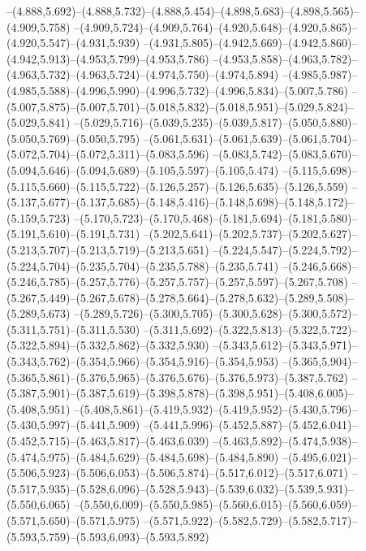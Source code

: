   --(4.888,5.692)--(4.888,5.732)--(4.888,5.454)--(4.898,5.683)--(4.898,5.565)--(4.909,5.758)%
  --(4.909,5.724)--(4.909,5.764)--(4.920,5.648)--(4.920,5.865)--(4.920,5.547)--(4.931,5.939)%
  --(4.931,5.805)--(4.942,5.669)--(4.942,5.860)--(4.942,5.913)--(4.953,5.799)--(4.953,5.786)%
  --(4.953,5.858)--(4.963,5.782)--(4.963,5.732)--(4.963,5.724)--(4.974,5.750)--(4.974,5.894)%
  --(4.985,5.987)--(4.985,5.588)--(4.996,5.990)--(4.996,5.732)--(4.996,5.834)--(5.007,5.786)%
  --(5.007,5.875)--(5.007,5.701)--(5.018,5.832)--(5.018,5.951)--(5.029,5.824)--(5.029,5.841)%
  --(5.029,5.716)--(5.039,5.235)--(5.039,5.817)--(5.050,5.880)--(5.050,5.769)--(5.050,5.795)%
  --(5.061,5.631)--(5.061,5.639)--(5.061,5.704)--(5.072,5.704)--(5.072,5.311)--(5.083,5.596)%
  --(5.083,5.742)--(5.083,5.670)--(5.094,5.646)--(5.094,5.689)--(5.105,5.597)--(5.105,5.474)%
  --(5.115,5.698)--(5.115,5.660)--(5.115,5.722)--(5.126,5.257)--(5.126,5.635)--(5.126,5.559)%
  --(5.137,5.677)--(5.137,5.685)--(5.148,5.416)--(5.148,5.698)--(5.148,5.172)--(5.159,5.723)%
  --(5.170,5.723)--(5.170,5.468)--(5.181,5.694)--(5.181,5.580)--(5.191,5.610)--(5.191,5.731)%
  --(5.202,5.641)--(5.202,5.737)--(5.202,5.627)--(5.213,5.707)--(5.213,5.719)--(5.213,5.651)%
  --(5.224,5.547)--(5.224,5.792)--(5.224,5.704)--(5.235,5.704)--(5.235,5.788)--(5.235,5.741)%
  --(5.246,5.668)--(5.246,5.785)--(5.257,5.776)--(5.257,5.757)--(5.257,5.597)--(5.267,5.708)%
  --(5.267,5.449)--(5.267,5.678)--(5.278,5.664)--(5.278,5.632)--(5.289,5.508)--(5.289,5.673)%
  --(5.289,5.726)--(5.300,5.705)--(5.300,5.628)--(5.300,5.572)--(5.311,5.751)--(5.311,5.530)%
  --(5.311,5.692)--(5.322,5.813)--(5.322,5.722)--(5.322,5.894)--(5.332,5.862)--(5.332,5.930)%
  --(5.343,5.612)--(5.343,5.971)--(5.343,5.762)--(5.354,5.966)--(5.354,5.916)--(5.354,5.953)%
  --(5.365,5.904)--(5.365,5.861)--(5.376,5.965)--(5.376,5.676)--(5.376,5.973)--(5.387,5.762)%
  --(5.387,5.901)--(5.387,5.619)--(5.398,5.878)--(5.398,5.951)--(5.408,6.005)--(5.408,5.951)%
  --(5.408,5.861)--(5.419,5.932)--(5.419,5.952)--(5.430,5.796)--(5.430,5.997)--(5.441,5.909)%
  --(5.441,5.996)--(5.452,5.887)--(5.452,6.041)--(5.452,5.715)--(5.463,5.817)--(5.463,6.039)%
  --(5.463,5.892)--(5.474,5.938)--(5.474,5.975)--(5.484,5.629)--(5.484,5.698)--(5.484,5.890)%
  --(5.495,6.021)--(5.506,5.923)--(5.506,6.053)--(5.506,5.874)--(5.517,6.012)--(5.517,6.071)%
  --(5.517,5.935)--(5.528,6.096)--(5.528,5.943)--(5.539,6.032)--(5.539,5.931)--(5.550,6.065)%
  --(5.550,6.009)--(5.550,5.985)--(5.560,6.015)--(5.560,6.059)--(5.571,5.650)--(5.571,5.975)%
  --(5.571,5.922)--(5.582,5.729)--(5.582,5.717)--(5.593,5.759)--(5.593,6.093)--(5.593,5.892)%
